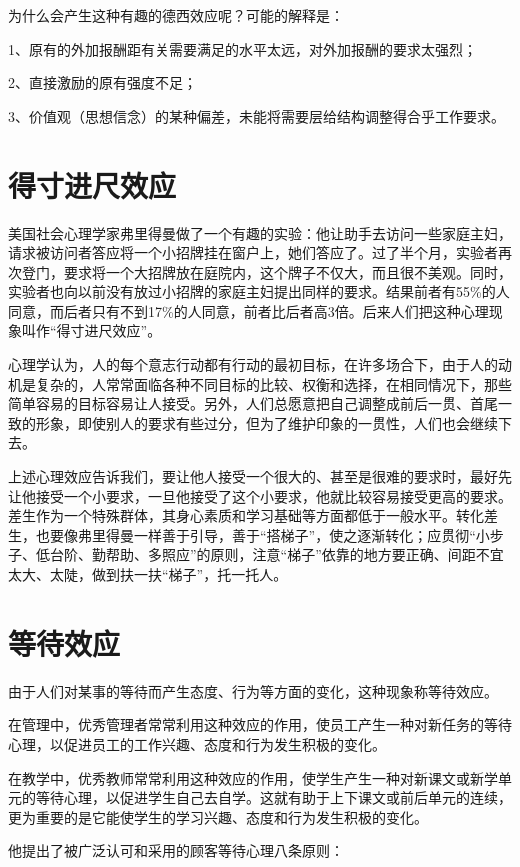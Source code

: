 \documentclass[11pt]{ctexart}
\begin{document}
为什么会产生这种有趣的德西效应呢？可能的解释是：

1、原有的外加报酬距有关需要满足的水平太远，对外加报酬的要求太强烈；

2、直接激励的原有强度不足；

3、价值观（思想信念）的某种偏差，未能将需要层给结构调整得合乎工作要求。
\section{得寸进尺效应}
\label{sec-29}


美国社会心理学家弗里得曼做了一个有趣的实验：他让助手去访问一些家庭主妇，请求被访问者答应将一个小招牌挂在窗户上，她们答应了。过了半个月，实验者再次登门，要求将一个大招牌放在庭院内，这个牌子不仅大，而且很不美观。同时，实验者也向以前没有放过小招牌的家庭主妇提出同样的要求。结果前者有55\%的人同意，而后者只有不到17\%的人同意，前者比后者高3倍。后来人们把这种心理现象叫作“得寸进尺效应”。

心理学认为，人的每个意志行动都有行动的最初目标，在许多场合下，由于人的动机是复杂的，人常常面临各种不同目标的比较、权衡和选择，在相同情况下，那些简单容易的目标容易让人接受。另外，人们总愿意把自己调整成前后一贯、首尾一致的形象，即使别人的要求有些过分，但为了维护印象的一贯性，人们也会继续下去。

上述心理效应告诉我们，要让他人接受一个很大的、甚至是很难的要求时，最好先让他接受一个小要求，一旦他接受了这个小要求，他就比较容易接受更高的要求。差生作为一个特殊群体，其身心素质和学习基础等方面都低于一般水平。转化差生，也要像弗里得曼一样善于引导，善于“搭梯子”，使之逐渐转化；应贯彻“小步子、低台阶、勤帮助、多照应”的原则，注意“梯子”依靠的地方要正确、间距不宜太大、太陡，做到扶一扶“梯子”，托一托人。
\section{等待效应}
\label{sec-30}


由于人们对某事的等待而产生态度、行为等方面的变化，这种现象称等待效应。

在管理中，优秀管理者常常利用这种效应的作用，使员工产生一种对新任务的等待心理，以促进员工的工作兴趣、态度和行为发生积极的变化。

在教学中，优秀教师常常利用这种效应的作用，使学生产生一种对新课文或新学单元的等待心理，以促进学生自己去自学。这就有助于上下课文或前后单元的连续，更为重要的是它能使学生的学习兴趣、态度和行为发生积极的变化。

他提出了被广泛认可和采用的顾客等待心理八条原则：
\end{document}
